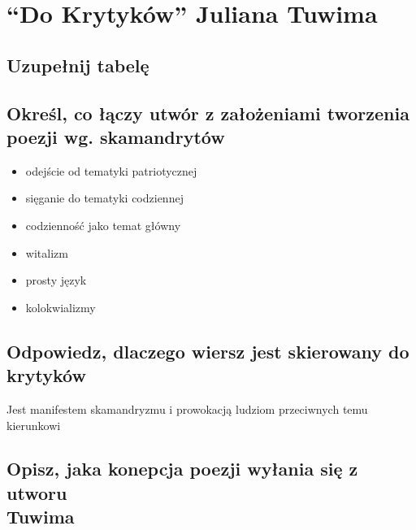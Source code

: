 \documentclass[a4paper]{article}
\begin{document}
\section{``Do Krytyków'' Juliana Tuwima}
\subsection{Uzupełnij tabelę}
\begin{table}[H]
    \centering
\end{table}
\pagebreak
\subsection{Określ, co łączy utwór z założeniami tworzenia poezji wg. skamandrytów}
\begin{itemize}
    \item odejście od tematyki patriotycznej
    \item sięganie do tematyki codziennej
    \item codzienność jako temat główny
    \item witalizm
    \item prosty język
    \item kolokwializmy
\end{itemize}
\subsection{Odpowiedz, dlaczego wiersz jest skierowany do krytyków}
Jest manifestem skamandryzmu i prowokacją ludziom przeciwnych temu kierunkowi
\subsection{Opisz, jaka konepcja poezji wyłania się z utworu \\ Tuwima}
\end{document}
